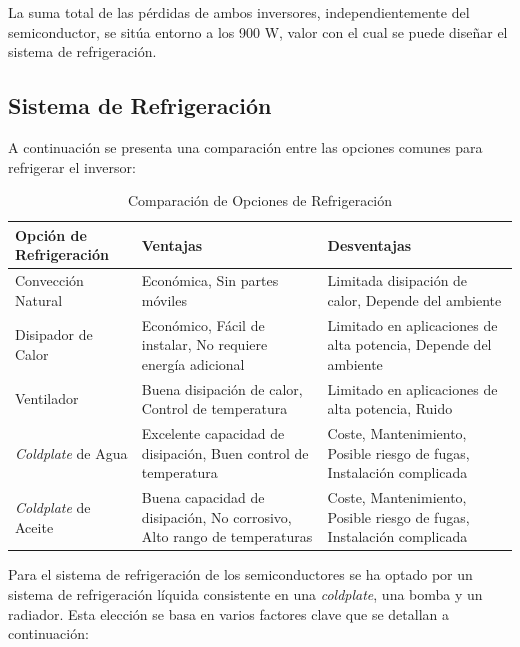 La suma total de las pérdidas de ambos inversores, independientemente del semiconductor, se sitúa entorno a los 900 W, valor con el cual se puede diseñar el sistema de refrigeración.

\subsection{Sistema de Refrigeración}

A continuación se presenta una comparación entre las opciones comunes para refrigerar el inversor:

\begin{table}[H]
	\centering
	\begin{tabular}{|p{2.5cm}|p{5cm}|p{5cm}|}
		\hline
		\textbf{Opción de Refrigeración} & \textbf{Ventajas} & \textbf{Desventajas} \\ \hline
		Convección Natural & Económica, Sin partes móviles & Limitada disipación de calor, Depende del ambiente \\ \hline
		Disipador de Calor & Económico, Fácil de instalar, No requiere energía adicional & Limitado en aplicaciones de alta potencia, Depende del ambiente \\ \hline
		Ventilador & Buena disipación de calor, Control de temperatura & Limitado en aplicaciones de alta potencia, Ruido \\ \hline
		\textit{Coldplate} de Agua & Excelente capacidad de disipación, Buen control de temperatura & Coste, Mantenimiento, Posible riesgo de fugas, Instalación complicada \\ \hline
		\textit{Coldplate} de Aceite & Buena capacidad de disipación, No corrosivo, Alto rango de temperaturas &  Coste, Mantenimiento, Posible riesgo de fugas, Instalación complicada \\ \hline
	\end{tabular}
	\caption{Comparación de Opciones de Refrigeración}
\end{table}



Para el sistema de refrigeración de los semiconductores se ha optado por un sistema de refrigeración líquida consistente en una \textit{coldplate}, una bomba y un radiador. Esta elección se basa en varios factores clave que se detallan a continuación:

